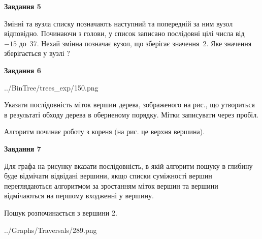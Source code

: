 \documentclass[12pt, ukrainian]{article}
\begin{document}
{\begin {large}
{\begin {center}\textbf{Завдання 5}\end {center}}\par
Змінні  та  вузла списку позначають наступний та попередній за ним вузол відповідно. Починаючи з голови, у список записано послідовні цілі числа від~$-15$ до~$37$. Нехай змінна  позначає вузол, що зберігає значення~$2$.
Яке значення зберігається у вузлі  ?\par
\newpage

{\begin {center}\textbf{Завдання 6}\end {center}}\par

\begin{center}
	{../BinTree/trees_exp/150.png}
\end{center}
Указати послідовність міток вершин дерева, зображеного на рис., що утвориться в результаті обходу дерева в оберненому порядку. Мітки записувати через пробіл.\par Алгоритм починає роботу з кореня (на рис. це верхня вершина).\par
\newpage

{\begin {center}\textbf{Завдання 7}\end {center}}\par
Для графа на рисунку вказати послідовність, в якій алгоритм пошуку в глибину буде відмічати відвідані вершини, якщо списки суміжності вершин переглядаються алгоритмом за зростанням міток вершин та вершини відмічаються на першому вход\-женні у вершину.\par
Пошук розпочинається з вершини 2.\par

\begin{center}
	{../Graphs/Traversals/289.png}
\end{center}\par
\newpage


\end{large}}
\end{document}
